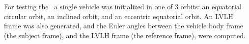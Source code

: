 %
%
% 
%



 For testing the \EulerDesc\, a single vehicle was initialized in one of 3 orbits: an equatorial circular orbit, an inclined orbit, and an eccentric equatorial orbit.  An LVLH frame was also generated, and the Euler angles between the vehicle body frame (the subject frame), and the LVLH frame (the reference frame), were computed.  

\label{test:Euler}

